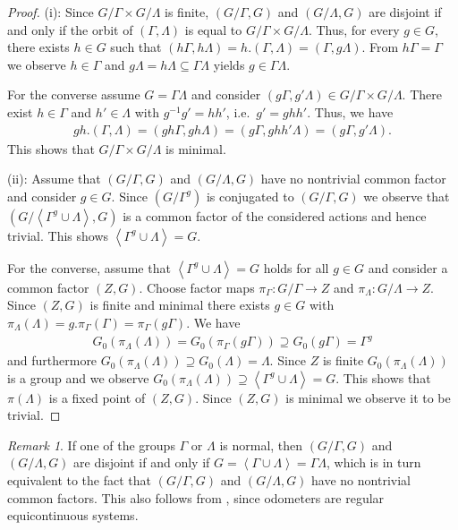 \documentclass[12pt, reqno]{amsart}
\theoremstyle{definition}
\theoremstyle{remark}
\newtheorem{remark}[theorem]{Remark}
\numberwithin{equation}{section}
\theoremstyle{theorem}
\theoremstyle{remark}
\newcommand{\grouphull}[1]{\left\langle #1 \right\rangle}
\begin{document}
\begin{proof}
(i):     
    Since $G/\Gamma\times G/\Lambda$ is finite, $(G/\Gamma,G)$ and $(G/\Lambda,G)$ are disjoint if and only if the orbit of $(\Gamma, \Lambda)$  is equal to $G/\Gamma\times G/\Lambda$. Thus, for every $g\in G$, there exists $h\in G$ such that 
    $(h\Gamma, h\Lambda)
    =h.(\Gamma, \Lambda)
    =(\Gamma, g\Lambda)$. 
    From $h\Gamma=\Gamma$ we observe $h\in \Gamma$ and  $g\Lambda=h\Lambda\subseteq \Gamma\Lambda$ yields
    $g\in \Gamma\Lambda$. 

    For the converse assume $G=\Gamma\Lambda$ and consider $(g\Gamma,g'\Lambda)\in G/\Gamma\times G/\Lambda$. 
    There exist $h\in \Gamma$ and $h'\in \Lambda$ with $g^{-1}g'=hh'$, i.e.\ $g'=ghh'$. 
    Thus, we have
    \begin{align*}
        gh.(\Gamma,\Lambda)
        = (gh\Gamma,gh\Lambda)
        = (g\Gamma, ghh'\Lambda)
        = (g\Gamma,g'\Lambda).
    \end{align*}
    This shows that $G/\Gamma\times G/\Lambda$ is minimal.  

(ii): 
    Assume that $(G/\Gamma,G)$ and $(G/\Lambda,G)$ have no nontrivial common factor and consider $g\in G$.
    Since $(G/\Gamma^g)$ is conjugated to $(G/\Gamma,G)$ we observe that $(G/\grouphull{\Gamma^g\cup \Lambda},G)$ is a common factor of the considered actions and hence trivial. 
    This shows $\grouphull{\Gamma^g\cup \Lambda}=G$. 

    For the converse, 
    assume that $\grouphull{\Gamma^g\cup \Lambda}=G$ holds for all $g\in G$ 
    and consider a common factor $(Z,G)$. 
    Choose factor maps $\pi_\Gamma\colon G/\Gamma\to Z$ and $\pi_\Lambda\colon G/\Lambda\to Z$. 
    Since $(Z,G)$ is finite and minimal there exists $g\in G$ with 
    $\pi_\Lambda(\Lambda)=g.\pi_\Gamma(\Gamma)=\pi_\Gamma(g\Gamma)$. 
    We have 
    \begin{align*}
        G_0(\pi_\Lambda(\Lambda))=G_0(\pi_\Gamma(g\Gamma))\supseteq G_0(g\Gamma)=\Gamma^g
    \end{align*}
    and furthermore $G_0(\pi_\Lambda(\Lambda))\supseteq G_0(\Lambda)=\Lambda$. 
    Since $Z$ is finite $G_0(\pi_\Lambda(\Lambda))$ is a group and we observe
    $G_0(\pi_\Lambda(\Lambda))\supseteq \grouphull{\Gamma^g\cup \Lambda}=G$.
    This shows that $\pi(\Lambda)$ is a fixed point of $(Z,G)$. 
    Since $(Z,G)$ is minimal we observe it to be trivial. 
\end{proof}

\begin{remark}
\label{rem:disjointnessFiniteOdometers}
    If one of the groups $\Gamma$ or $\Lambda$ is normal, then $(G/\Gamma, G)$ and $(G/\Lambda,G)$ are disjoint if and only if $G=\grouphull{\Gamma \cup \Lambda}=\Gamma\Lambda$, 
    which is in turn equivalent to the fact that $(G/\Gamma,G)$ and $(G/\Lambda,G)$ 
    have no nontrivial common factors. 
    This also follows from \cite[Theorem~11.21]{auslander1988minimal}, 
    since odometers are regular equicontinuous systems. 
\end{remark} 
\end{document}
